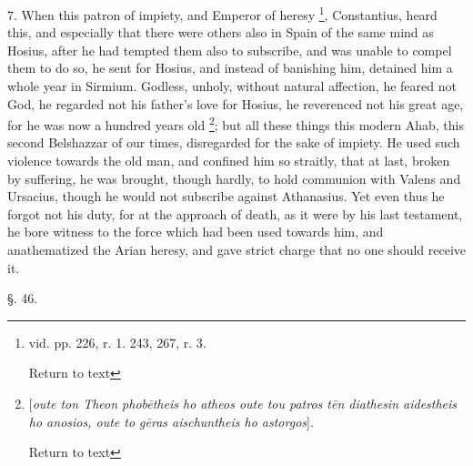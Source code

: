 7. When this patron of impiety, and Emperor of
heresy \footnote{vid. pp. 226, r. 1. 243, 267, r. 3.

Return to text}, Constantius,
heard this, and especially that there were others also in Spain of the
same mind as Hosius, after he had tempted them also to subscribe, and
was unable to compel them to do so, he sent for Hosius, and instead of
banishing him, detained him a whole year in Sirmium. Godless, unholy,
without natural affection, he feared not God, he regarded not his
father's love for Hosius, he reverenced not his great age, for he was
now a hundred years old \footnote{[\emph{oute ton Theon phob\={e}theis ho atheos oute tou patros t\={e}n
diathesin aidestheis ho anosios, oute to g\={e}ras aischuntheis ho
astorgos}].

Return to text

};
but all these things this modern Ahab, this second Belshazzar of our
times, disregarded for the sake of impiety. He used such violence
towards the old man, and confined him so straitly, that at last,
broken by suffering, he was brought, though hardly, to hold communion
with Valens and Ursacius, though he would not subscribe against
Athanasius. Yet even thus he forgot not his duty, for at the approach
of death, as it were by his last testament, he bore witness to the
force which had been used towards him, and anathematized the Arian
heresy, and gave strict charge that no one should receive it.

§. 46.

